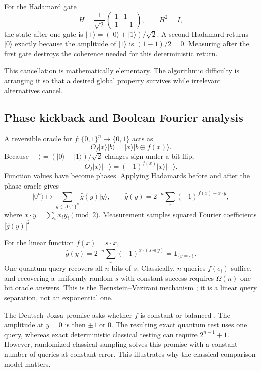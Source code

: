 \documentclass[11pt,a4paper]{article}
\newcommand{\ket}[1]{\lvert #1\rangle}
\theoremstyle{definition}
\theoremstyle{remark}
\numberwithin{equation}{section}
\begin{document}
For the Hadamard gate
\begin{equation}
 H=\frac1{\sqrt2}\begin{pmatrix}1&1\\1&-1\end{pmatrix},\qquad H^2=I,
\end{equation}
the state after one gate is $\ket{+}= (\ket{0}+\ket{1})/\sqrt2$. A second Hadamard
returns $\ket{0}$ exactly because the amplitude of $\ket{1}$ is
$(1-1)/2=0$. Measuring after the first gate destroys the coherence needed
for this deterministic return.

This cancellation is mathematically elementary. The algorithmic difficulty
is arranging it so that a desired global property survives while irrelevant
alternatives cancel.

\subsection{Phase kickback and Boolean Fourier analysis}
A reversible oracle for $f:\{0,1\}^n\to\{0,1\}$ acts as
\begin{equation}
 O_f\ket{x}\ket{b}=\ket{x}\ket{b\oplus f(x)}.
\end{equation}
Because $\ket{-}=(\ket{0}-\ket{1})/\sqrt2$ changes sign under a bit flip,
\begin{equation}\label{eq:kickback}
 O_f\ket{x}\ket{-}=(-1)^{f(x)}\ket{x}\ket{-}.
\end{equation}
Function values have become phases. Applying Hadamards before and after the
phase oracle gives
\begin{equation}\label{eq:fourierboolean}
 \ket{0^n}\longmapsto
 \sum_{y\in\{0,1\}^n}\widehat g(y)\ket{y},\qquad
 \widehat g(y)=2^{-n}\sum_x(-1)^{f(x)+x\cdot y},
\end{equation}
where $x\cdot y=\sum_i x_i y_i\pmod2$. Measurement samples squared Fourier
coefficients $|\widehat g(y)|^2$.

For the linear function $f(x)=s\cdot x$,
\begin{equation}
 \widehat g(y)=2^{-n}\sum_x(-1)^{x\cdot(s\oplus y)}
 =\mathbf1_{\{y=s\}}.
\end{equation}
One quantum query recovers all $n$ bits of $s$. Classically, $n$ queries
$f(e_i)$ suffice, and recovering a uniformly random $s$ with constant success
requires $\Omega(n)$ one-bit oracle answers. This is the
Bernstein--Vazirani mechanism \citep{bernstein1997}; it is a linear query separation, not an
exponential one.

The Deutsch--Jozsa promise asks whether $f$ is constant or balanced
\citep{deutsch1992}. The amplitude at
$y=0$ is then $\pm1$ or $0$. The resulting exact quantum test uses one query,
whereas exact deterministic classical testing can require $2^{n-1}+1$.
However, randomized classical sampling solves this promise with a constant
number of queries at constant error. This illustrates why the classical
comparison model matters.
\end{document}
